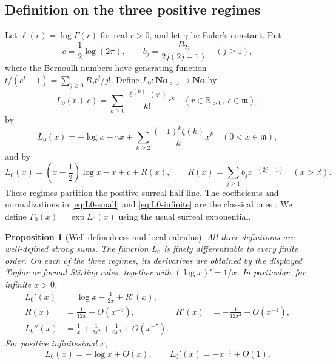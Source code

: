 \documentclass[11pt,letterpaper]{article}
\numberwithin{equation}{section}
\theoremstyle{plain}
\newtheorem{proposition}[proposition]{Proposition}
\theoremstyle{definition}
\theoremstyle{remark}
\newcommand{\No}{\mathbf{No}}
\newcommand{\R}{\mathbb R}
\newcommand{\mi}{\mathfrak m}
\begin{document}
\subsection{Definition on the three positive regimes}
Let $\ell(r)=\log\Gamma(r)$ for real $r>0$, and let $\gamma$ be Euler's
constant. Put
\begin{equation}\label{eq:coefficients}
 c=\frac12\log(2\pi),\qquad
 b_j=\frac{B_{2j}}{2j(2j-1)}\quad(j\ge1),
\end{equation}
where the Bernoulli numbers have generating function
$t/(e^t-1)=\sum_{j\ge0}B_jt^j/j!$.
Define $L_0:\No_{>0}\to\No$ by
\begin{equation}\label{eq:L0-finite}
 L_0(r+\epsilon)=\sum_{k\ge0}\frac{\ell^{(k)}(r)}{k!}\epsilon^k
 \quad(r\in\R_{>0},\ \epsilon\in\mi),
\end{equation}
by
\begin{equation}\label{eq:L0-small}
 L_0(x)=-\log x-\gamma x+
 \sum_{k\ge2}\frac{(-1)^k\zeta(k)}k x^k
 \quad(0<x\in\mi),
\end{equation}
and by
\begin{equation}\label{eq:L0-infinite}
 L_0(x)=\left(x-\frac12\right)\log x-x+c+R(x),
 \qquad
 R(x)=\sum_{j\ge1}b_jx^{-(2j-1)}
 \quad(x>\R).
\end{equation}
These regimes partition the positive surreal half-line. The coefficients and
normalizations in \eqref{eq:L0-small} and \eqref{eq:L0-infinite} are the
classical ones \cite[\S\S5.7,5.11]{DLMF57,DLMF511}. We define
$\Gamma_0(x)=\exp L_0(x)$ using the usual surreal exponential.

\begin{proposition}[Well-definedness and local calculus]\label{prop:baseline-calculus}
All three definitions are well-defined strong sums. The function $L_0$ is
finely differentiable to every finite order. On each of the three regimes,
its derivatives are obtained by the displayed Taylor or formal Stirling
rules, together with $(\log x)'=1/x$. In particular, for infinite $x>0$,
\begin{align}
 L_0'(x)&=\log x-\frac1{2x}+R'(x),\label{eq:digamma}\\
 R(x)&=\frac1{12x}+O(x^{-3}),&
 R'(x)&=-\frac1{12x^2}+O(x^{-4}),\label{eq:R-bounds}\\
 L_0''(x)&=\frac1x+\frac1{2x^2}+\frac1{6x^3}+O(x^{-5}).
\end{align}
For positive infinitesimal $x$,
\begin{equation}\label{eq:small-bounds}
 L_0(x)=-\log x+O(x),\qquad L_0'(x)=-x^{-1}+O(1).
\end{equation}
\end{proposition}
\end{document}
